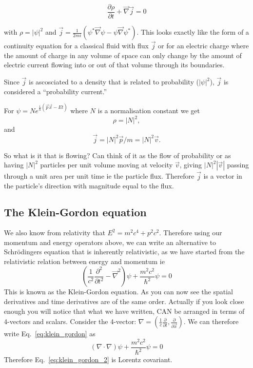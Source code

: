 \[
\frac{\partial{\rho}}{\partial t}+\vec{\nabla}\vec{j}=0
\]

with $\rho=|\psi|^2$ and $\vec{j}=\frac{1}{2mi}(\psi^*\vec{\nabla}\psi-\psi\vec{\nabla}\psi^*)$. This
looks exactly like the form of a continuity equation for a classical fluid with flux $\vec{j}$
or for an electric charge where the amount of charge in any volume of
space can only change by the amount of electric current flowing into or out of that volume
through its boundaries.

Since $\vec{j}$ is ascosciated to a density that is related to probability ($|\psi|^2$), $\vec{j}$
is considered a ``probability current.''

For $\psi=Ne^{\frac{i}{h}(\vec{p}\vec{x}-E t)}$ where $N$ is a normalisation constant we get
\[
\rho=|N|^2,
\]
and
\[
\vec{j}=|N|^2\vec{p}/m=|N|^2\vec{v}.
\]

So what is it that is flowing? Can think of it as the flow of probability or as having
$|N|^2$ particles per unit volume moving at velocity $\vec{v}$, giving $|N|^2|\vec{v}|$ passing
through a unit area per unit time ie the particle flux. Therefore $\vec{j}$ is a vector in the particle's
direction with magnitude equal to the flux.


\subsection{The Klein-Gordon equation}
We also know from relativity that $E^2=m^2c^4+p^2c^2$. Therefore using our momentum and energy operators above, we can write an alternative to Schr\"odingers equation that is inherently relativistic, as we have started from the relativistic relation between energy and momentum ie
\begin{equation}
\label{eq:klein_gordon}
(\frac{1}{c^2}\frac{\partial^{2}}{\partial t^2}-\vec{\nabla}^2)\psi+\frac{m^2c^2}{\hbar^2}\psi=0
\end{equation}
This is known as the Klein-Gordon equation. As you can now see the spatial derivatives and time derivatives are of the same order. Actually if you look close enough you will notice that what we have written, CAN be arranged in terms of 4-vectors and scalars. Consider the 4-vector: $\nabla=(\frac{1}{c}\frac{\partial}{\partial t},\frac{\partial}{\partial \vec{x}})$. We can therefore write Eq.~\ref{eq:klein_gordon} as
\begin{equation}
\label{eq:klein_gordon_2}
(\nabla\cdot\nabla)\psi+\frac{m^2c^2}{\hbar^2}\psi=0
\end{equation}
Therefore Eq.~\ref{eq:klein_gordon_2} is Lorentz covariant.

